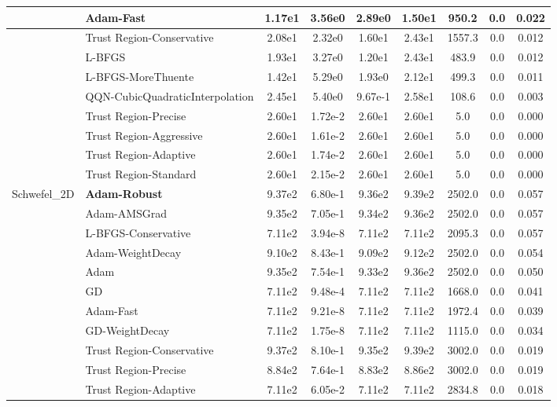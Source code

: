 \documentclass{article}
\begin{document}
\begin{longtable}{|l|l|c|c|c|c|c|c|c|}
\hline
 & Adam-Fast & 1.17e1 & 3.56e0 & 2.89e0 & 1.50e1 & 950.2 & 0.0 & 0.022 \\
\hline
 & Trust Region-Conservative & 2.08e1 & 2.32e0 & 1.60e1 & 2.43e1 & 1557.3 & 0.0 & 0.012 \\
\hline
 & L-BFGS & 1.93e1 & 3.27e0 & 1.20e1 & 2.43e1 & 483.9 & 0.0 & 0.012 \\
\hline
 & L-BFGS-MoreThuente & 1.42e1 & 5.29e0 & 1.93e0 & 2.12e1 & 499.3 & 0.0 & 0.011 \\
\hline
 & QQN-CubicQuadraticInterpolation & 2.45e1 & 5.40e0 & 9.67e-1 & 2.58e1 & 108.6 & 0.0 & 0.003 \\
\hline
 & Trust Region-Precise & 2.60e1 & 1.72e-2 & 2.60e1 & 2.60e1 & 5.0 & 0.0 & 0.000 \\
\hline
 & Trust Region-Aggressive & 2.60e1 & 1.61e-2 & 2.60e1 & 2.60e1 & 5.0 & 0.0 & 0.000 \\
\hline
 & Trust Region-Adaptive & 2.60e1 & 1.74e-2 & 2.60e1 & 2.60e1 & 5.0 & 0.0 & 0.000 \\
\hline
 & Trust Region-Standard & 2.60e1 & 2.15e-2 & 2.60e1 & 2.60e1 & 5.0 & 0.0 & 0.000 \\
Schwefel\_2D & \textbf{Adam-Robust} & 9.37e2 & 6.80e-1 & 9.36e2 & 9.39e2 & 2502.0 & 0.0 & 0.057 \\
\hline
 & Adam-AMSGrad & 9.35e2 & 7.05e-1 & 9.34e2 & 9.36e2 & 2502.0 & 0.0 & 0.057 \\
\hline
 & L-BFGS-Conservative & 7.11e2 & 3.94e-8 & 7.11e2 & 7.11e2 & 2095.3 & 0.0 & 0.057 \\
\hline
 & Adam-WeightDecay & 9.10e2 & 8.43e-1 & 9.09e2 & 9.12e2 & 2502.0 & 0.0 & 0.054 \\
\hline
 & Adam & 9.35e2 & 7.54e-1 & 9.33e2 & 9.36e2 & 2502.0 & 0.0 & 0.050 \\
\hline
 & GD & 7.11e2 & 9.48e-4 & 7.11e2 & 7.11e2 & 1668.0 & 0.0 & 0.041 \\
\hline
 & Adam-Fast & 7.11e2 & 9.21e-8 & 7.11e2 & 7.11e2 & 1972.4 & 0.0 & 0.039 \\
\hline
 & GD-WeightDecay & 7.11e2 & 1.75e-8 & 7.11e2 & 7.11e2 & 1115.0 & 0.0 & 0.034 \\
\hline
 & Trust Region-Conservative & 9.37e2 & 8.10e-1 & 9.35e2 & 9.39e2 & 3002.0 & 0.0 & 0.019 \\
\hline
 & Trust Region-Precise & 8.84e2 & 7.64e-1 & 8.83e2 & 8.86e2 & 3002.0 & 0.0 & 0.019 \\
\hline
 & Trust Region-Adaptive & 7.11e2 & 6.05e-2 & 7.11e2 & 7.11e2 & 2834.8 & 0.0 & 0.018 \\

\end{longtable}
\end{document}

